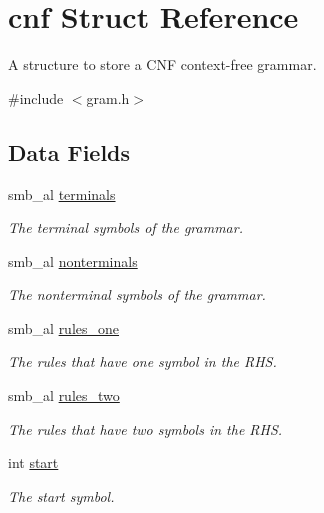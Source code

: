 \hypertarget{structcnf}{\section{cnf \-Struct \-Reference}
\label{structcnf}
}


\-A structure to store a \-C\-N\-F context-\/free grammar.  




{\ttfamily \#include $<$gram.\-h$>$}

\subsection*{\-Data \-Fields}
\begin{DoxyCompactItemize}
\item 
smb\-\_\-al \hyperlink{structcnf_ae85a135e82c4af0e75739a21b3ec03b4}{terminals}
\begin{DoxyCompactList}\small\item\em \-The terminal symbols of the grammar. \end{DoxyCompactList}\item 
smb\-\_\-al \hyperlink{structcnf_a48ad19ba58732910c48d1e821a3ea428}{nonterminals}
\begin{DoxyCompactList}\small\item\em \-The nonterminal symbols of the grammar. \end{DoxyCompactList}\item 
\hypertarget{structcnf_a829100f9c15a2838a1fc4e259667d06a}{smb\-\_\-al \hyperlink{structcnf_a829100f9c15a2838a1fc4e259667d06a}{rules\-\_\-one}}\label{structcnf_a829100f9c15a2838a1fc4e259667d06a}

\begin{DoxyCompactList}\small\item\em \-The rules that have one symbol in the \-R\-H\-S. \end{DoxyCompactList}\item 
\hypertarget{structcnf_a950455ed240737b1e4f06faffccd5175}{smb\-\_\-al \hyperlink{structcnf_a950455ed240737b1e4f06faffccd5175}{rules\-\_\-two}}\label{structcnf_a950455ed240737b1e4f06faffccd5175}

\begin{DoxyCompactList}\small\item\em \-The rules that have two symbols in the \-R\-H\-S. \end{DoxyCompactList}\item 
\hypertarget{structcnf_a37722a150250e2a5a98e5e0d11e53449}{int \hyperlink{structcnf_a37722a150250e2a5a98e5e0d11e53449}{start}}\label{structcnf_a37722a150250e2a5a98e5e0d11e53449}

\begin{DoxyCompactList}\small\item\em \-The start symbol. \end{DoxyCompactList}\end{DoxyCompactItemize}



